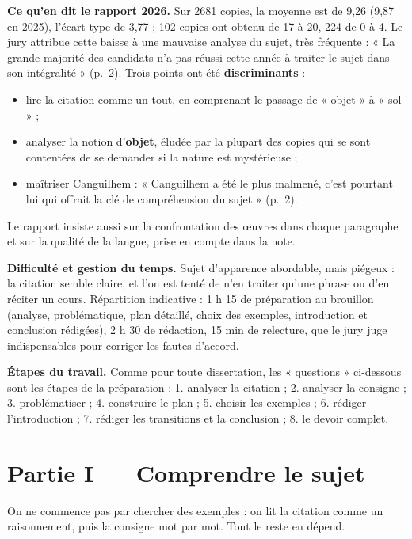 \documentclass[11pt,a4paper]{article}
\providecommand{\tightlist}{\setlength{\itemsep}{0pt}\setlength{\parskip}{0pt}}
\begin{document}
\textbf{Ce qu'en dit le rapport 2026.} Sur 2681 copies, la moyenne est de 9,26 (9,87 en 2025), l'écart type de 3,77 ; 102 copies ont obtenu de 17 à 20, 224 de 0 à 4. Le jury attribue cette baisse à une mauvaise analyse du sujet, très fréquente : « La grande majorité des candidats n'a pas réussi cette année à traiter le sujet dans son intégralité » (p.~2). Trois points ont été \textbf{discriminants} :

\begin{itemize}
\tightlist
\item
  lire la citation comme un tout, en comprenant le passage de « objet » à « sol » ;
\item
  analyser la notion d'\textbf{objet}, éludée par la plupart des copies qui se sont contentées de se demander si la nature est mystérieuse ;
\item
  maîtriser Canguilhem : « Canguilhem a été le plus malmené, c'est pourtant lui qui offrait la clé de compréhension du sujet » (p.~2).
\end{itemize}

Le rapport insiste aussi sur la confrontation des œuvres dans chaque paragraphe et sur la qualité de la langue, prise en compte dans la note.

\textbf{Difficulté et gestion du temps.} Sujet d'apparence abordable, mais piégeux : la citation semble claire, et l'on est tenté de n'en traiter qu'une phrase ou d'en réciter un cours. Répartition indicative : 1 h 15 de préparation au brouillon (analyse, problématique, plan détaillé, choix des exemples, introduction et conclusion rédigées), 2 h 30 de rédaction, 15 min de relecture, que le jury juge indispensables pour corriger les fautes d'accord.

\textbf{Étapes du travail.} Comme pour toute dissertation, les « questions » ci-dessous sont les étapes de la préparation : 1. analyser la citation ; 2. analyser la consigne ; 3. problématiser ; 4. construire le plan ; 5. choisir les exemples ; 6. rédiger l'introduction ; 7. rédiger les transitions et la conclusion ; 8. le devoir complet.

\hypertarget{partie-i-comprendre-le-sujet}{%
\section{Partie I --- Comprendre le sujet}\label{partie-i-comprendre-le-sujet}}

On ne commence pas par chercher des exemples : on lit la citation comme un raisonnement, puis la consigne mot par mot. Tout le reste en dépend.
\end{document}
